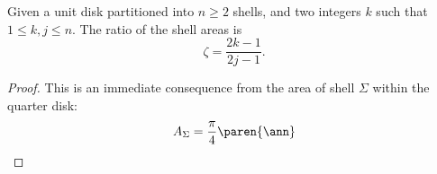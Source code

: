 \begin{myTheorem}  
Given a unit disk partitioned into $n\ge2$ shells, and two integers $k$ such that $1\le k, j \le n$. The ratio of the shell areas is
\begin{equation}
  \zeta = \frac{2k-1}{2j-1} .
  \label{eq:zeta}
\end{equation}
\label{eq:sectors dom}
\end{myTheorem}  %
\begin{proof}
This is an immediate consequence from the area of shell $\Sigma$ within the quarter disk:
\begin{equation} 
  A_{\Sigma} = \frac{\pi}{4} \paren{ \ann }
\end{equation}
\end{proof}  %


\endinput %